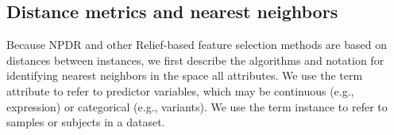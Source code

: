 \documentclass{bioinfo}
\begin{document}
\def\ri{R_i}
\def\rj{R_j}
\def\kmi{k_{M_i}}
\def\khi{k_{H_i}}
\def\hji{H_{j_i}}
\def\ma{\overline{M}_a}
\def\ha{\overline{H}_a}
\def\mnu{M_\nu}
\def\hnu{H_\nu}
\def\myd{\text{diff}}
\def\ka{\bar{k}_\alpha}

\subsection{Distance metrics and nearest neighbors}\label{sec:reform}
Because NPDR and other Relief-based feature selection methods are based on distances between instances, we first describe the algorithms and notation for identifying nearest neighbors in the space all attributes.
We use the term attribute to refer to predictor variables, which may be continuous (e.g., expression) or categorical (e.g., variants).
We use the term instance to refer to samples or subjects in a dataset.
\end{document}
